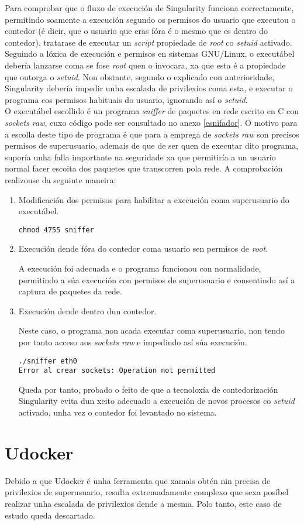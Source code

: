 Para comprobar que o fluxo de execución de Singularity funciona correctamente, permitindo soamente a execución segundo os permisos do usuario que executou o contedor (é dicir, que o usuario que eras fóra é o mesmo que es dentro do contedor), tratarase de executar un \textit{script} propiedade de \textit{root} co \textit{setuid} activado.\\

Seguindo a lóxica de execución e permisos en sistemas GNU/Linux, o executábel debería lanzarse coma se fose \textit{root} quen o invocara, xa que esta é a propiedade que outorga o \textit{setuid}. Non obstante, segundo o explicado con anterioridade, Singularity debería impedir unha escalada de privilexios coma esta, e executar o programa cos permisos habituais do usuario, ignorando así o \textit{setuid}.\\

O executábel escollido é un programa \textit{sniffer} de paquetes en rede escrito en C con \textit{sockets raw}, cuxo código pode ser consultado no anexo \ref{esnifador}. O motivo para a escolla deste tipo de programa é que para a emprega de \textit{sockets raw} son precisos permisos de superusuario, ademais de que de ser quen de executar dito programa, suporía unha falla importante na seguridade xa que permitiría a un usuario normal facer escoita dos paquetes que transcorren pola rede. A comprobación realizouse da seguinte maneira:

\begin{enumerate}
\item Modificación dos permisos para habilitar a execución coma superusuario do executábel.

\begin{lstlisting}[]
chmod 4755 sniffer
\end{lstlisting}

\item Execución dende fóra do contedor coma usuario sen permisos de \textit{root}.

A execución foi adecuada e o programa funcionou con normalidade, permitindo a súa execución con permisos de superusuario e consentindo así a captura de paquetes da rede.

\item Execución dende dentro dun contedor.

Neste caso, o programa non acada executar coma superusuario, non tendo por tanto acceso aos \textit{sockets raw} e impedindo así súa execución.

\begin{lstlisting}[]
./sniffer eth0
Error al crear sockets: Operation not permitted
\end{lstlisting}

Queda por tanto, probado o feito de que a tecnoloxía de contedorización Singularity evita dun xeito adecuado a execución de novos procesos co \textit{setuid} activado, unha vez o contedor foi levantado no sistema.

\end{enumerate}

\section{Udocker}

Debido a que Udocker é unha ferramenta que xamais obtén nin precisa de privilexios de superusuario, resulta extremadamente complexo que sexa posíbel realizar unha escalada de privilexios dende a mesma. Polo tanto, este caso de estudo queda descartado.